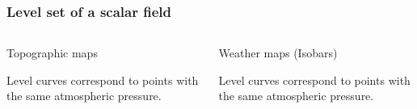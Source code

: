 \begin{frame}
\frametitle{Level set of a scalar field}
\begin{columns}
\begin{column}{0.5\textwidth}
\begin{center}
Topographic maps
\end{center}
Level curves correspond to points with the same atmospheric pressure.
\end{column}
\begin{column}{0.5\textwidth}
\begin{center}
Weather maps (Isobars)
\end{center}
Level curves correspond to points with the same atmospheric pressure.
\end{column}
\end{columns}
\end{frame}


